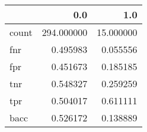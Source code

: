 \begin{tabular}{lrr}
\toprule
{} &         0.0 &        1.0 \\
\midrule
count &  294.000000 &  15.000000 \\
fnr   &    0.495983 &   0.055556 \\
fpr   &    0.451673 &   0.185185 \\
tnr   &    0.548327 &   0.259259 \\
tpr   &    0.504017 &   0.611111 \\
bacc  &    0.526172 &   0.138889 \\
\bottomrule
\end{tabular}
